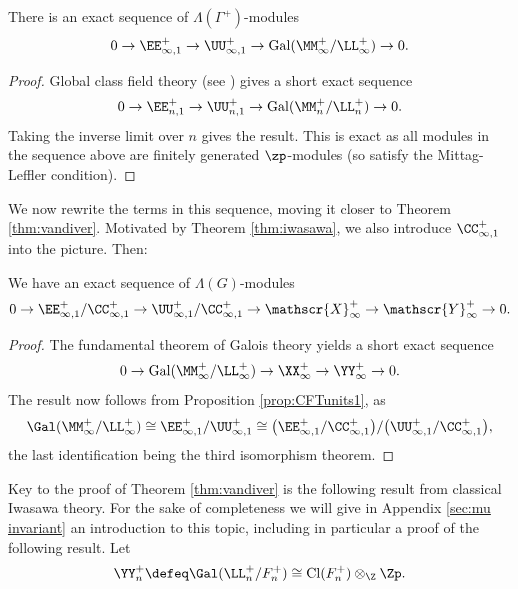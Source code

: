\documentclass[a4paper,10pt, english, reqno]{smfart}
\newcommand{\GG}{\Gamma}
\numberwithin{equation}{section}
\begin{document}


\begin{proposition} \label{prop:CFTunits1}
There is an exact sequence of $\Lambda(\GG^+)$-modules
\[ 
0 \to \EE^+_{\infty, 1} \to \UU^+_{\infty, 1} \to \mathrm{Gal}(\MM^+_\infty / \LL^+_\infty) \to 0. 
\]
\end{proposition}

\begin{proof}
Global class field theory (see \cite[Cor.\ 13.6]{Washington2}) gives a short exact sequence
\begin{equation}\label{eq:cft} 
0 \to \EE^+_{n, 1} \to \UU^+_{n, 1} \to \mathrm{Gal}(\MM^+_n / \LL^+_n) \to 0. 
\end{equation}
Taking the inverse limit over $n$ gives the result. This is exact as all modules in the sequence above are finitely generated $\zp$-modules (so satisfy the Mittag-Leffler condition).
\end{proof}


We now rewrite the terms in this sequence, moving it closer to Theorem \ref{thm:vandiver}.  Motivated by Theorem \ref{thm:iwasawa}, we also introduce $\CC_{\infty,1}^+$ into the picture. Then:

\begin{corollary} \label{cor:CFTunits2} We have an exact sequence of $\Lambda(G)$-modules
\[ 0\to \EE^+_{\infty, 1} / \CC^+_{\infty, 1} \to \UU^+_{\infty, 1} / \CC^+_{\infty, 1} \to \mathscr{X}^+_\infty \to \mathscr{Y}^+_\infty \to 0.\]
\end{corollary}


\begin{proof}
The fundamental theorem of Galois theory yields a short exact sequence
\[
    0 \to \mathrm{Gal}(\MM_\infty^+/\LL_\infty^+) \to \XX_\infty^+ \to \YY_\infty^+ \to 0.
\]
The result now follows from Proposition \ref{prop:CFTunits1}, as
\[
    \Gal(\MM_\infty^+/\LL_\infty^+) \cong \EE_{\infty,1}^+/\UU_{\infty,1}^+ \cong \big(\EE_{\infty,1}^+/\CC_{\infty,1}^+\big)/\big(\UU_{\infty,1}^+/\CC_{\infty,1}^+\big),
\]
the last identification being the third isomorphism theorem.
\end{proof}


Key to the proof of Theorem \ref{thm:vandiver} is the following result from classical Iwasawa theory. For the sake of completeness we will give in Appendix \ref{sec:mu invariant} an introduction to this topic, including in particular a proof of the following result. Let 
\begin{equation}\label{eq:Y_n^+}
\YY_n^+ \defeq \Gal(\LL_n^+/F_n^+) \cong \mathrm{Cl}(F_n^+)\otimes_{\Z}\Zp.
\end{equation}
\end{document}
